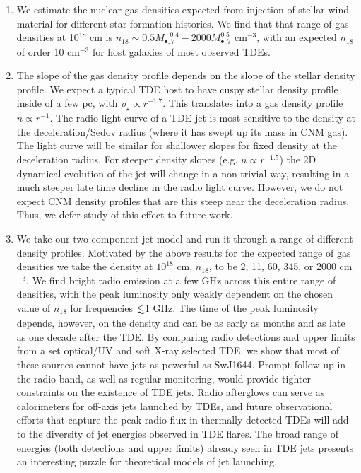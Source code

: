 \documentclass[usenatbib,fleqn]{mnras}
\newcommand\lsim{\mathrel{\rlap{\lower4pt\hbox{\hskip1pt$\sim$}}
    \raise1pt\hbox{$<$}}}
\newcommand{\Mbh}[1][]{M_{\bullet#1}}
\begin{document}
\begin{enumerate}
\item We estimate the nuclear gas densities expected from injection of
  stellar wind material for different star formation histories. We
  find that that range of gas densities at 10$^{18}$ cm is $n_{18}
  \sim 0.5 \Mbh[,7]^{-0.4} - 2000 \Mbh[,7]^{0.5}$ cm$^{-3}$, with an
  expected $n_{18}$ of order 10 cm$^{-3}$ for host galaxies of most
  observed TDEs.

\item The slope of the gas density profile depends on the slope of the
  stellar density profile. We expect a typical TDE host to have cuspy
  stellar density profile inside of a few pc, with $\rho_\star \propto
  r^{-1.7}$. This translates into a gas density profile $n \propto
  r^{-1}$. The radio light curve of a TDE jet is most sensitive to the
  density at the deceleration/Sedov radius (where it has swept up its
  mass in CNM gas). The light curve will be similar for shallower
  slopes for fixed density at the deceleration radius. For steeper
  density slopes (e.g. $n\propto r^{-1.5}$) the 2D dynamical evolution
  of the jet will change in a non-trivial way, resulting in a much
  steeper late time decline in the radio light curve. However, we do
  not expect CNM density profiles that are this steep near the
  deceleration radius. Thus, we defer study of this effect to future work.

\item We take our two component jet model and run it through a range
  of different density profiles. Motivated by the above results for
  the expected range of gas densities we take the density at $10^{18}$
  cm, $n_{18}$, to be 2, 11, 60, 345, or 2000 cm$^{-3}$. We find
  bright radio emission at a few GHz across this entire range of
  densities, with the peak luminosity only weakly dependent on the
  chosen value of $n_{18}$ for frequencies $\lsim$1 GHz. The time of
  the peak luminosity depends, however, on the density and can be as
  early as months and as late as one decade after the TDE. By
  comparing radio detections and upper limits from a set optical/UV
  and soft X-ray selected TDE, we show that most of these sources
  cannot have jets as powerful as SwJ1644. Prompt follow-up in the
  radio band, as well as regular monitoring, would provide tighter
  constraints on the existence of TDE jets. Radio afterglows can serve
  as calorimeters for off-axis jets launched by TDEs, and future
  observational efforts that capture the peak radio flux in thermally
  detected TDEs will add to the diversity of jet energies observed in
  TDE flares.  The broad range of energies (both detections and upper
  limits) already seen in TDE jets presents an interesting puzzle for
  theoretical models of jet launching.
\end{enumerate}
\end{document}
